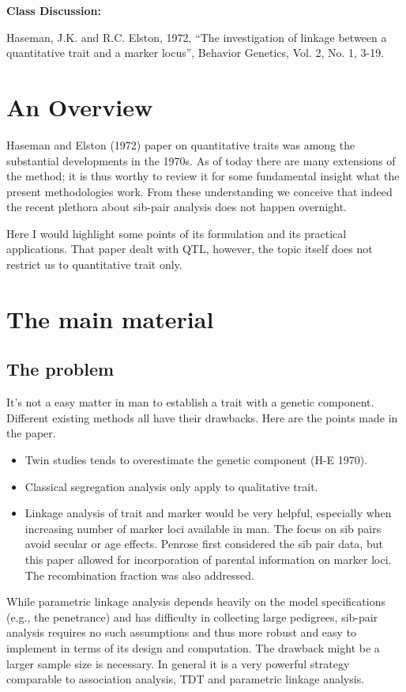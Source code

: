 
{\noindent \huge\bf Class Discussion:}\bigskip

Haseman, J.K. and R.C. Elston, 1972, ``The investigation of linkage
between a quantitative trait and a marker locus'', Behavior Genetics, Vol.
2, No. 1, 3-19.

\section{An Overview}

  Haseman and Elston (1972) paper on quantitative traits was among the
substantial developments in the 1970s.  As of today there are many extensions
of the method; it is thus worthy to review it for some fundamental insight what
the present methodologies work.  From these understanding we conceive that
indeed the recent plethora about sib-pair analysis does not happen overnight.

Here I would highlight some points of its formulation and
its practical applications. That paper dealt with QTL, however, the
topic itself does not restrict us to quantitative trait only.

\section{The main material}

\subsection{The problem}
  It's not a easy matter in man to establish a trait with a genetic
component. Different existing methods all have their drawbacks. Here are the
points made in the paper.
\begin{itemize}
\item Twin studies tends to overestimate the genetic component (H-E
1970).
\item Classical segregation analysis only apply to qualitative trait.
\item Linkage analysis of trait and marker would be very helpful,
especially when increasing number of marker loci available in man.
The focus on sib pairs avoid secular or age effects. Penrose first
considered the sib pair data, but this paper allowed for
incorporation of parental information on marker loci. The
recombination fraction was also addressed.
\end{itemize}
While parametric linkage analysis depends heavily on the model specifications
(e.g., the penetrance) and has difficulty in collecting large pedigrees,
sib-pair analysis requires no such assumptions and thus more robust
and easy to implement in terms of its design and computation.  The
drawback might be a larger sample size is necessary.  In general it is a very
powerful strategy comparable to association analysis, TDT and parametric linkage
analysis.
